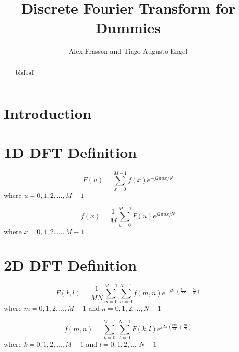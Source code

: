 \documentclass[12pt]{article}
\title{Discrete Fourier Transform for Dummies}
\author{Alex Frasson and Tiago Augusto Engel\inst{1}}
\begin{document}
 
\maketitle


\begin{abstract}
blalball
\end{abstract}

\section{Introduction}

\section{1D DFT Definition}
\begin{equation}
F(u)=\sum_{x=0}^{M-1}f(x) e^{-j 2\pi u x / N}
\end{equation}
where $u = 0,1,2,\dots, M-1$

\begin{equation}
f(x)=\frac{1}{M}\sum_{u=0}^{M-1}F(u) e^{j 2\pi u x / N}
\end{equation}
where $x = 0,1,2,\dots, M-1$

\section{2D DFT Definition}
\begin{equation}
F(k,l)=\frac{1}{MN}\sum_{m=0}^{M-1}\sum_{n=0}^{N-1} f(m,n) e^{-j 2\pi (\frac{km}{M} + \frac{ln}{N})}
\end{equation}
where $m = 0,1,2,\dots, M-1$ and $n = 0,1,2,\dots, N-1$

\begin{equation}
f(m,n)=\sum_{k=0}^{M-1}\sum_{l=0}^{N-1} F(k,l) e^{j 2\pi (\frac{km}{M} + \frac{ln}{N})}
\end{equation}
where $k = 0,1,2,\dots, M-1$ and $l = 0,1,2,\dots, N-1$



\end{document}
